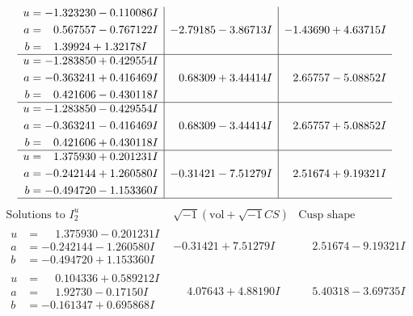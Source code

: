 \documentclass[1p]{elsarticle_modified}
\theoremstyle{definition}
\newcommand{\I}{\sqrt{-1}}
\begin{document}
$$\begin{array}{c|c|c}
\begin{aligned}
u &= -1.323230 - 0.110086 I \\
a &= \phantom{-}0.567557 - 0.767122 I \\
b &= \phantom{-}1.39924 + 1.32178 I\end{aligned}
 & -2.79185 - 3.86713 I & -1.43690 + 4.63715 I \\ \hline\begin{aligned}
u &= -1.283850 + 0.429554 I \\
a &= -0.363241 + 0.416469 I \\
b &= \phantom{-}0.421606 - 0.430118 I\end{aligned}
 & \phantom{-}0.68309 + 3.44414 I & \phantom{-}2.65757 - 5.08852 I \\ \hline\begin{aligned}
u &= -1.283850 - 0.429554 I \\
a &= -0.363241 - 0.416469 I \\
b &= \phantom{-}0.421606 + 0.430118 I\end{aligned}
 & \phantom{-}0.68309 - 3.44414 I & \phantom{-}2.65757 + 5.08852 I \\ \hline\begin{aligned}
u &= \phantom{-}1.375930 + 0.201231 I \\
a &= -0.242144 + 1.260580 I \\
b &= -0.494720 - 1.153360 I\end{aligned}
 & -0.31421 - 7.51279 I & \phantom{-}2.51674 + 9.19321 I\\
 \hline 
 \end{array}$$\newpage$$\begin{array}{c|c|c}  
\text{Solutions to }I^u_{2}& \I (\text{vol} + \sqrt{-1}CS) & \text{Cusp shape}\\
 \hline 
\begin{aligned}
u &= \phantom{-}1.375930 - 0.201231 I \\
a &= -0.242144 - 1.260580 I \\
b &= -0.494720 + 1.153360 I\end{aligned}
 & -0.31421 + 7.51279 I & \phantom{-}2.51674 - 9.19321 I \\ \hline\begin{aligned}
u &= \phantom{-}0.104336 + 0.589212 I \\
a &= \phantom{-}1.92730 - 0.17150 I \\
b &= -0.161347 + 0.695868 I\end{aligned}
 & \phantom{-}4.07643 + 4.88190 I & \phantom{-}5.40318 - 3.69735 I \\ \hline\begin{aligned}

\end{aligned}
\end{array}$$
\end{document}
